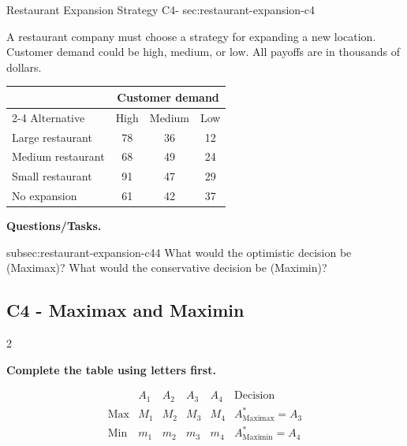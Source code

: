 	\sectionScored
	{Restaurant Expansion Strategy}
	{C4-}
	{sec:restaurant-expansion-c4}
	{
		A restaurant company must choose a strategy for expanding a new location.
		Customer demand could be high, medium, or low. All payoffs are in
		thousands of dollars.
			\begin{center}
			\renewcommand{\arraystretch}{1.3}
			\small
			\begin{tabular}{lccc}
				\toprule
				& \multicolumn{3}{c}{Customer demand} \\
				\cmidrule(lr){2-4}
				Alternative & High & Medium & Low \\
				\midrule
				Large restaurant & 78 & 36 & 12 \\
				Medium restaurant & 68 & 49 & 24 \\
				Small restaurant & 91 & 47 & 29 \\
				No expansion & 61 & 42 & 37 \\
				\bottomrule
			\end{tabular}
		\end{center}
		\vspace{-5mm}
		
		\textbf{Questions/Tasks.}
		\begin{enumerate}
			\CriterionTask
			{subsec:restaurant-expansion-c4}{4}
			{What would the optimistic decision be (Maximax)? What would the conservative decision be (Maximin)? }
		\end{enumerate}
		
		\label{subsec:restaurant-expansion-c4}
		\subsection*{C4 - Maximax and Maximin }
		
		
		\begin{multicols}{2}
			
			\textbf{Complete the table using letters first.}
			
			\[
			\begin{array}{c|ccccc}
				& A_1 & A_2 & A_3 & A_4 & \text{Decision}\\
				\hline
				\text{Max} &
				M_1 & M_2 & M_3 & M_4 &
				A^*_{\mathrm{Maximax}}=A_3
				\\
				\text{Min} &
				m_1 & m_2 & m_3 & m_4 &
				A^*_{\mathrm{Maximin}}=A_4
			\end{array}
			\]
			

\end{multicols}}
